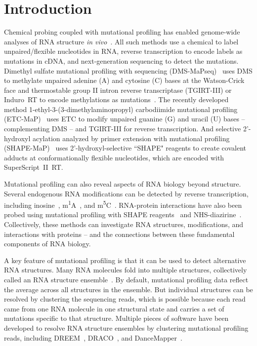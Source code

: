 \documentclass[11pt]{article}
\begin{document}
\clearpage

\section{Introduction}

Chemical probing coupled with mutational profiling has enabled genome-wide analyses of RNA structure \textit{in vivo}~\cite{Spitale2023}.
All such methods use a chemical to label unpaired/flexible nucleotides in RNA, reverse transcription to encode labels as mutations in cDNA, and next-generation sequencing to detect the mutations.
Dimethyl sulfate mutational profiling with sequencing (DMS-MaPseq)~\cite{Zubradt2016} uses DMS to methylate unpaired adenine (A) and cytosine (C) bases at the Watson-Crick face and thermostable group II intron reverse transcriptase (TGIRT-III) or Induro~RT to encode methylations as mutations~\cite{RomeroAgosto2024}.
The recently developed method 1-ethyl-3-(3-dimethylaminopropyl) carbodiimide mutational profiling (ETC-MaP)~\cite{Douds2024} uses ETC to modify unpaired guanine (G) and uracil (U) bases -- complementing DMS -- and TGIRT-III for reverse transcription.
And selective 2'-hydroxyl acylation analyzed by primer extension with mutational profiling (SHAPE-MaP)~\cite{Siegfried2014} uses 2'-hydroxyl-selective ``SHAPE" reagents to create covalent adducts at conformationally flexible nucleotides, which are encoded with SuperScript~II~RT.

Mutational profiling can also reveal aspects of RNA biology beyond structure.
Several endogenous RNA modifications can be detected by reverse transcription, including inosine~\cite{Okada2019}, m\textsuperscript{1}A~\cite{Li2017}, and m\textsuperscript{5}C~\cite{Schaefer2008}.
RNA-protein interactions have also been probed using mutational profiling with SHAPE reagents~\cite{Smola2015} and NHS-diazirine~\cite{Weidmann2021}.
Collectively, these methods can investigate RNA structures, modifications, and interactions with proteins -- and the connections between these fundamental components of RNA biology.

A key feature of mutational profiling is that it can be used to detect alternative RNA structures.
Many RNA molecules fold into multiple structures, collectively called an RNA structure ensemble~\cite{Spitale2023}.
By default, mutational profiling data reflect the average across all structures in the ensemble.
But individual structures can be resolved by clustering the sequencing reads, which is possible because each read came from one RNA molecule in one structural state and carries a set of mutations specific to that structure.
Multiple pieces of software have been developed to resolve RNA structure ensembles by clustering mutational profiling reads, including DREEM~\cite{Tomezsko2020}, DRACO~\cite{Morandi2021}, and DanceMapper~\cite{Olson2022}.
\end{document}
